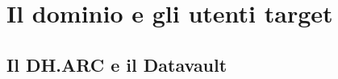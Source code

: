 \section{Il dominio e gli utenti target}
\label{sec:dominio}
%
%

\subsection{Il DH.ARC e il Datavault}
\label{subsec:dharc}
%
%
%

